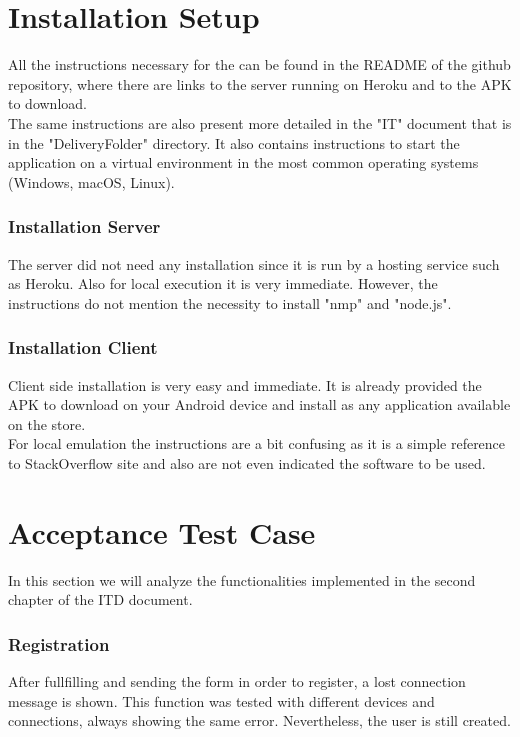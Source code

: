 \documentclass[numbers=noenddot, 12pt, a4paper, oneside]{scrbook}
\begin{document}
\chapter{Installation Setup}

All the instructions necessary for the can be found in the README of the github repository, where there are links to the server running on Heroku and to the APK to download. \\
The same instructions are also present more detailed in the "IT" document that is in the "DeliveryFolder" directory. It also contains instructions to start the application on a virtual environment in the most common operating systems
(Windows, macOS, Linux).

\subsection*{Installation Server}
The server did not need any installation since it is run by a hosting service such as Heroku. Also for local execution it is very immediate. However, the instructions do not mention the necessity to install "nmp" and "node.js".

\subsection*{Installation Client}
Client side installation is very easy and immediate. It is already provided the APK to download on your Android device and install as any application available on the store. \\
For local emulation the instructions are a bit confusing as it is a simple reference to StackOverflow site and also are not even indicated the software to be used.

\chapter{Acceptance Test Case}

In this section we will analyze the functionalities implemented in the second chapter of the ITD document.

\subsection*{Registration}

After fullfilling and sending the form in order to register, a lost connection message is shown. This function was tested with different devices and connections, always showing the same error. Nevertheless, the user is still created.
\end{document}
